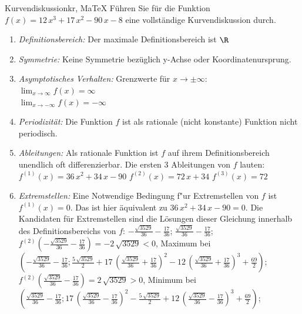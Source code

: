  \providecommand{\MoIl}{(} 
 \providecommand{\MoIr}{)}
 \providecommand{\MIntvlSep}{;} 
 \providecommand{\MElSetSep}{;} 
 \begin{MAufgabe}{Kurvendiskussion}{kr, MaTeX}
 F\"uhren Sie f\"ur die Funktion $f(x)=12\, x^3 + 17\, x^2 - 90\, x - 8$ eine vollst\"andige Kurvendiskussion durch.\\ 
 \ifLsg\Loesung
 \begin{enumerate}
 \item \emph{Definitionsbereich:} 
 Der maximale Definitionsbereich ist $\R$\item \emph{Symmetrie:} 
 Keine Symmetrie bez\"uglich y-Achse oder Koordinatenursprung.\item \emph{Asymptotisches Verhalten:} 
 Grenzwerte f\"ur $x\rightarrow \pm \infty$: \\ 
 $\lim_{x\rightarrow \infty} f(x)=\infty$ \\ 
 $\lim_{x\rightarrow -\infty} f(x)=- \infty$ \\ 
 \item \emph{Periodizit\"at:} 
 Die Funktion $f$ ist als rationale (nicht konstante) Funktion nicht periodisch.\item \emph{Ableitungen:} 
 Als rationale Funktion ist $f$ auf ihrem Definitionsbereich unendlich oft differenzierbar. 
 Die ersten 3 Ableitungen von $f$ lauten: \\ 
 $f^{(1)}(x)=36\, x^2 + 34\, x - 90$\newline 
  $f^{(2)}(x)=72\, x + 34$\newline 
  $f^{(3)}(x)=72$\newline 
  \item \emph{Extremstellen:} 
 Eine Notwendige Bedingung f"ur Extremstellen von $f$ ist $f^{(1)}(x)=0$. 
 Das ist hier \"aquivalent zu $36\, x^2 + 34\, x - 90=0$. 
 Die Kandidaten f\"ur Extremstellen sind die L\"osungen dieser Gleichung innerhalb des Definitionsbereichs von $f$: $ - \frac{\sqrt{3529}}{36} - \frac{17}{36}$; $\frac{\sqrt{3529}}{36} - \frac{17}{36}$; \\ 
 $f^{(2)}( - \frac{\sqrt{3529}}{36} - \frac{17}{36})=- 2\, \sqrt{3529}$$<0$, Maximum bei $( - \frac{\sqrt{3529}}{36} - \frac{17}{36};\frac{5\, \sqrt{3529}}{2} + 17\, {\left(\frac{\sqrt{3529}}{36} + \frac{17}{36}\right)}^2 - 12\, {\left(\frac{\sqrt{3529}}{36} + \frac{17}{36}\right)}^3 + \frac{69}{2})$; \\ 
 $f^{(2)}(\frac{\sqrt{3529}}{36} - \frac{17}{36})=2\, \sqrt{3529}$$>0$, Minimum bei $(\frac{\sqrt{3529}}{36} - \frac{17}{36};17\, {\left(\frac{\sqrt{3529}}{36} - \frac{17}{36}\right)}^2 - \frac{5\, \sqrt{3529}}{2} + 12\, {\left(\frac{\sqrt{3529}}{36} - \frac{17}{36}\right)}^3 + \frac{69}{2})$; \\ 

\end{enumerate}
\end{MAufgabe}
